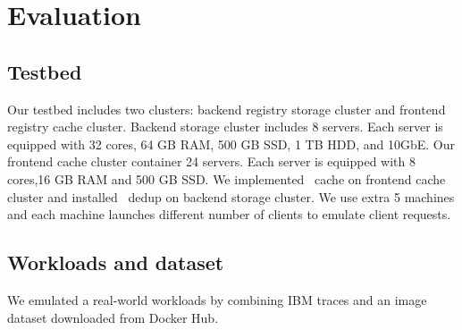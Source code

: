 \section{ Evaluation}
\label{sec:Evaluation}


\subsection{Testbed}

Our testbed includes two clusters: backend registry storage cluster and frontend registry cache cluster. 
Backend storage cluster includes 8 servers. 
Each server is equipped with 32 cores, 64 GB RAM, 500 GB SSD, 1 TB HDD, and 10GbE. 
Our frontend cache cluster container 24 servers. Each server is equipped with 8 cores,16 GB RAM and 500 GB SSD. We implemented \sysname~cache on frontend cache cluster and installed \sysname~dedup on backend storage cluster. 
We use extra 5 machines and each machine launches different number of clients to emulate client requests.
\subsection{Workloads and dataset}
We emulated a real-world workloads by combining IBM traces and an image dataset downloaded from Docker Hub. 






